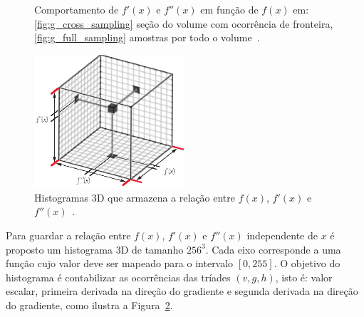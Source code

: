 \begin{figure}[t]
	\centering
	\caption{Comportamento de $ f'(x) $ e $ f''(x) $ em função de $ f(x) $ em: \ref{fig:g_cross_sampling} seção do volume com ocorrência de fronteira, \ref{fig:g_full_sampling} amostras por todo o volume~\cite{gordon}.}
	\label{fig:g_sampling}
\end{figure}

\begin{figure}[b]
	\centering
	\includegraphics[width=0.5\textwidth]{images/g_histo3d}
	\caption{Histogramas 3D que armazena a relação entre $ f(x) $, $ f'(x) $ e $ f''(x) $~\cite{gordonms}.}
	\label{fig:g_histo3d}
\end{figure}
	
	Para guardar a relação entre $ f(x) $, $ f'(x) $ e $ f''(x) $ independente de $x$ é proposto um histograma 3D de tamanho $ 256^{3} $. Cada eixo corresponde a uma função cujo valor deve ser mapeado para o intervalo $ [0,255] $. O objetivo do histograma é contabilizar as ocorrências das tríades $ (v,g,h) $, isto é: valor escalar, primeira derivada na direção do gradiente e segunda derivada na direção do gradiente, como ilustra a Figura~\ref{fig:g_histo3d}.
	
